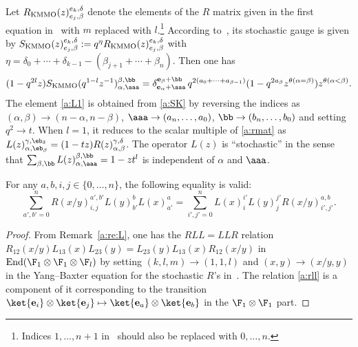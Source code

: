 \begin{rema}\label{a:re:L}
Let $R_{\rm KMMO}(z)^{e_k, \delta}_{e_j, \beta}$ denote the elements 
of the $R$ matrix given in the first equation in~\cite[App.A]{KMMO} with 
$m$ replaced with $l$.\footnote{Indices $1,\ldots, n+1$ in~\cite{KMMO} should also be 
replaced with $0,\ldots, n$.}
According to~\cite[Eqs.(15),(16)]{KMMO},  its stochastic gauge is given by 
$S_{\rm KMMO}(z)^{e_k, \delta}_{e_j, \beta}:=
q^\eta R_{\rm KMMO}(z)^{e_k, \delta}_{e_j, \beta}$ with 
$\eta = \delta_0+\cdots + \delta_{k-1} - (\beta_{j+1}+ \cdots + \beta_n)$.
Then one has  
\begin{align}\label{a:SK}
(1-q^{2l}z)S_{\rm KMMO}(q^{1-l}z^{-1})^{\beta, \bb}_{\alpha, \aaa}
=
\delta_{ {\bf e}_\alpha +\aaa}^{ {\bf e}_\beta+ \bb}\,q^{2(a_0+ \cdots + a_{\beta-1})}(1-q^{2a_\beta}z^{\theta(\alpha=\beta)})z^{\theta(\alpha<\beta)}.
\end{align}
The element \eqref{a:L1} is obtained from \eqref{a:SK}  by reversing the indices as 
$(\alpha, \beta) \rightarrow (n-\alpha, n-\beta)$, 
$\aaa \rightarrow (a_n,\ldots, a_0)$, 
$\bb \rightarrow (b_n,\ldots, b_0)$ and setting $q^2 \rightarrow t$.
%
When $l=1$, it reduces to the scalar multiple of \eqref{a:rmat} 
as $L(z)^{\gamma, \eb_\delta}_{\alpha, \eb_\beta}=(1-tz)R(z)^{\gamma, \delta}_{\alpha, \beta}$.
The operator $L(z)$ is ``stochastic'' in the sense that 
$\sum_{\beta, \bb} L(z)^{\beta, \bb}_{\alpha, \aaa} = 1-z t^l$ is independent of 
$\alpha$ and $\aaa$.
\end{rema}

\begin{prop}[$RLL=LLR$ relation]\label{a:pr:RLL}
For any $a,b,i,j \in \{0,\ldots, n\}$, the following equality is valid:
\begin{equation}\label{a:rll}
\sum_{a',b'=0}^nR(x/y)_{i, j}^{a', b'}L(y)_{b'}^bL(x)_{a'}^a
=\sum_{i',j'=0}^nL(x)_i^{i'}L(y)_j^{j'}R(x/y)_{i', j'}^{a, b}.
\end{equation}
\end{prop}
\begin{proof}
From Remark~\ref{a:re:L}, one has the $RLL=LLR$ relation
$R_{12}(x/y)L_{13}(x)L_{23}(y) = L_{23}(y)L_{13}(x)R_{12}(x/y)$ 
in $\mathrm{End}(\F_1 \otimes \F_1 \otimes \F_l)$
by  setting $(k,l,m) \rightarrow (1,1,l)$ and 
$(x,y)\rightarrow (x/y,y)$ in the Yang--Baxter equation for the stochastic $R$'s 
in~\cite[Prop.~4]{KMMO}.
The relation \eqref{a:rll} is a component of it corresponding to the transition
$\ket{{\bf e}_i} \otimes \ket{{\bf e}_j}  \mapsto \ket{{\bf e}_a} \otimes \ket{{\bf e}_b}$ 
in the $\F_1 \otimes \F_1$ part.
\end{proof}

